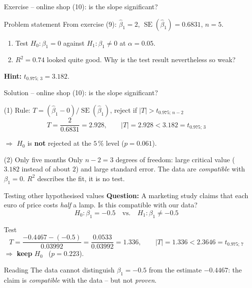 \documentclass[aspectratio=169,11pt]{beamer}
\begin{document}
\begin{frame}{Exercise -- online shop (10): is the slope significant?}
  \begin{block}{Problem statement}
    From exercise (9): $\hat\beta_1 = 2$, $\operatorname{SE}(\hat\beta_1) = 0.6831$,
    $n = 5$.
    \begin{enumerate}
      \setlength{\itemsep}{2pt}
      \item Test $H_0\colon \beta_1 = 0$ against $H_1\colon \beta_1 \ne 0$ at
            $\alpha = 0.05$.
      \item $R^{2} = 0.74$ looked quite good. Why is the test result
            nevertheless so weak?
    \end{enumerate}
  \end{block}
  \textbf{Hint:} $t_{0.975;\,3} = 3.182$.
\end{frame}

\begin{frame}{Solution -- online shop (10): is the slope significant?}
  \begin{exampleblock}{(1) Rule: $T = (\hat\beta_1 - 0)/\operatorname{SE}(\hat\beta_1)$, reject if $|T| > t_{0.975;\,n-2}$}
    \[
      T = \frac{2}{0.6831} = \mathbf{2.928}, \qquad |T| = 2.928 < 3.182 = t_{0.975;\,3}
    \]
    \vspace{-6pt}

    $\Rightarrow$ $H_0$ is \textbf{not} rejected at the $5\,\%$ level ($p = 0.061$).
  \end{exampleblock}
  \begin{alertblock}{(2) Only five months}
    Only $n - 2 = 3$ degrees of freedom: large critical value ($3.182$
    instead of about $2$) and large standard error. The data are
    \emph{compatible} with $\beta_1 = 0$. $R^{2}$ describes the fit, it is
    no test.
  \end{alertblock}
\end{frame}

\begin{frame}{Testing other hypothesised values}
  \textbf{Question:} A marketing study claims that each euro of price costs
  \emph{half} a lamp. Is this compatible with our data?
  \[
    H_0:\beta_1=-0.5 \quad\text{vs.}\quad H_1:\beta_1\neq-0.5
  \]
  \begin{exampleblock}{Test}
    \[
      T=\frac{-0.4467-(-0.5)}{0.03992}=\frac{0.0533}{0.03992}=1.336,
      \qquad |T|=1.336<2.3646=t_{0.975;\,7}
    \]
    $\Rightarrow$ \textbf{keep} $H_0$ \ ($p=0.223$).
  \end{exampleblock}
  \begin{block}{Reading}
    The data cannot distinguish $\beta_1=-0.5$ from the estimate $-0.4467$:
    the claim is \emph{compatible} with the data -- but not \emph{proven}.
  \end{block}
\end{frame}
\end{document}
